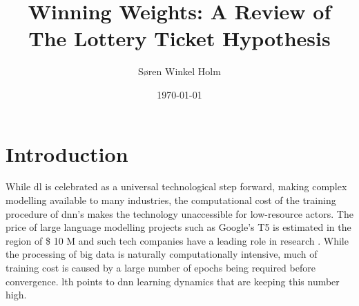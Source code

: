 \documentclass[12pt,fleqn,twocolumn]{article}
\title{Winning Weights: A Review of The Lottery Ticket Hypothesis}
\author{Søren Winkel Holm}
\date{\today}
\begin{document}
\setlength{\headheight}{15pt}
\addtolength{\topmargin}{-2.5pt}

\maketitle
\thispagestyle{fancy}

\section*{Introduction}%
\label{sec:Introduction}
While \acrfull{dl} is celebrated as a universal technological step forward, making complex modelling available to many industries, the computational cost of the training procedure of \acrfull{dnn}'s makes the technology unaccessible for low-resource actors.
The price of large language modelling projects such as Google's T5 is estimated in the region of \$ 10 M \cite{Sharir2020TheCO} and such tech companies have a leading role in research \cite{ivanov2020icml, ivanov2020neurips}.
While the processing of big data is naturally computationally intensive, much of training cost is caused by a large number of epochs being required before convergence.
\acrfull{lth} points to \acrshort{dnn} learning dynamics that are keeping this number high.
\end{document}
